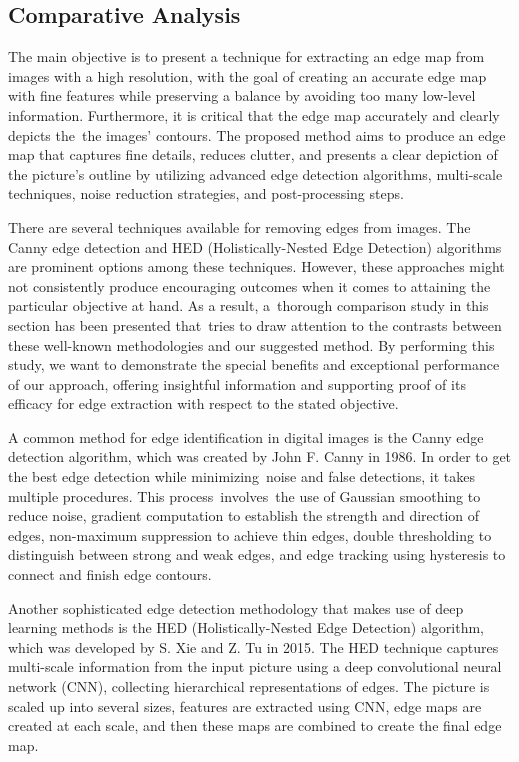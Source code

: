 \documentclass{70_styles/svproc}
\begin{document}
\subsection{Comparative Analysis}
The main objective is to present a technique for extracting an edge map from images with a high resolution, with the goal of creating an accurate edge map with fine features while preserving a balance by avoiding too many low-level information. Furthermore, it is critical that the edge map accurately and clearly depicts the the images' contours. The proposed method aims to produce an edge map that captures fine details, reduces clutter, and presents a clear depiction of the picture's outline by utilizing advanced edge detection algorithms, multi-scale techniques, noise reduction strategies, and post-processing steps.

There are several techniques available for removing edges from images. The Canny edge detection and HED (Holistically-Nested Edge Detection) algorithms are prominent options among these techniques. However, these approaches might not consistently produce encouraging outcomes when it comes to attaining the particular objective at hand. As a result, a thorough comparison study in this section has been presented that tries to draw attention to the contrasts between these well-known methodologies and our suggested method. By performing this study, we want to demonstrate the special benefits and exceptional performance of our approach, offering insightful information and supporting proof of its efficacy for edge extraction with respect to the stated objective.

A common method for edge identification in digital images is the Canny edge detection algorithm, which was created by John F. Canny in 1986. In order to get the best edge detection while minimizing noise and false detections, it takes multiple procedures. This process involves the use of Gaussian smoothing to reduce noise, gradient computation to establish the strength and direction of edges, non-maximum suppression to achieve thin edges, double thresholding to distinguish between strong and weak edges, and edge tracking using hysteresis to connect and finish edge contours.

Another sophisticated edge detection methodology that makes use of deep learning methods is the HED (Holistically-Nested Edge Detection) algorithm, which was developed by S. Xie and Z. Tu in 2015. The HED technique captures multi-scale information from the input picture using a deep convolutional neural network (CNN), collecting hierarchical representations of edges. The picture is scaled up into several sizes, features are extracted using CNN, edge maps are created at each scale, and then these maps are combined to create the final edge map. 
\end{document}
